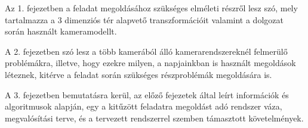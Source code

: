 Az 1. fejezetben a feladat megoldásához szükséges elméleti részről lesz szó, mely tartalmazza a 3 dimenziós tér alapvető transzformációit valamint a dolgozat során használt kameramodellt.

A 2. fejezetben szó lesz a több kamerából álló kamerarendszereknél felmerülő problémákra, illetve, hogy ezekre milyen, a napjainkban is használt megoldások léteznek, kitérve a feladat során szükséges részproblémák megoldására is.

A 3. fejezetben bemutatásra kerül, az előző fejezetek által leírt információk és algoritmusok alapján, egy a kitűzött feladatra megoldást adó rendszer váza, megvalósítási terve, és a tervezett rendszerrel szemben támasztott követelmények.
